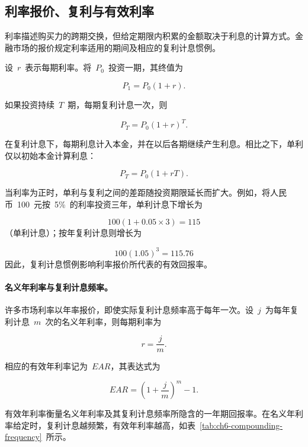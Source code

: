 \subsection{利率报价、复利与有效利率}

利率描述购买力的跨期交换，但给定期限内积累的金额取决于利息的计算方式。金融市场的报价规定利率适用的期间及相应的复利计息惯例。

设~$r$~表示每期利率。将~$P_0$~投资一期，其终值为

\begin{equation}
P_1=P_0(1+r).
\label{eq:ch6-one-period-growth}
\end{equation}

如果投资持续~$T$~期，每期复利计息一次，则

\begin{equation}
P_T=P_0(1+r)^T.
\label{eq:ch6-compound-growth}
\end{equation}

在复利计息下，每期利息计入本金，并在以后各期继续产生利息。相比之下，单利仅以初始本金计算利息：

\begin{equation}
P_T=P_0(1+rT).
\label{eq:ch6-simple-interest}
\end{equation}

当利率为正时，单利与复利之间的差距随投资期限延长而扩大。例如，将人民币~100~元按~5\%~的利率投资三年，单利计息下增长为

$$
100(1+0.05\times 3)=115
$$
（单利计息）；按年复利计息则增长为

$$
100(1.05)^3=115.76
$$
因此，复利计息惯例影响利率报价所代表的有效回报率。

\paragraph{名义年利率与复利计息频率。}

许多市场利率以年率报价，即使实际复利计息频率高于每年一次。设~$j$~为每年复利计息~$m$~次的名义年利率，则每期利率为

\begin{equation}
r=\frac{j}{m}.
\end{equation}

相应的有效年利率记为~$EAR$，其表达式为

\begin{equation}
EAR=
\left(1+\frac{j}{m}\right)^m-1.
\label{eq:ch6-ear}
\end{equation}

有效年利率衡量名义年利率及其复利计息频率所隐含的一年期回报率。在名义年利率给定时，复利计息越频繁，有效年利率越高，如表~\ref{tab:ch6-compounding-frequency}~所示。

